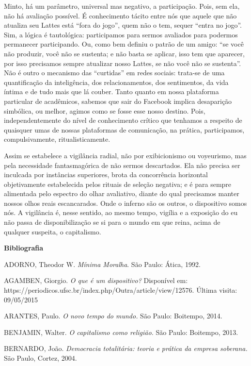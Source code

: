 Minto, há um parâmetro, universal mas negativo, a participação. Pois,
sem ela, não há avaliação possível. É conhecimento tácito entre nós que
aquele que não atualiza seu Lattes está ``fora do jogo'', quem não o
tem, sequer ``entra no jogo''. Sim, a lógica é tautológica: participamos
para sermos avaliados para podermos permanecer participando. Ou, como
bem definiu o patrão de um amigo: ``se você não produzir, você não se
sustenta; e não basta se aplicar, isso tem que aparecer, por isso
precisamos sempre atualizar nosso Lattes, se não você não se sustenta''.
Não é outro o mecanismo das ``curtidas'' em redes sociais: trata-se de
uma quantificação da inteligência, dos relacionamentos, dos sentimentos,
da vida íntima e de tudo mais que lá couber. Tanto quanto em nossa
plataforma particular de acadêmicos, sabemos que sair do Facebook
implica desaparição simbólica, ou melhor, agimos como se fosse esse
nosso destino. Pois, independentemente do nível de conhecimento crítico
que tenhamos a respeito de quaisquer umas de nossas plataformas de
comunicação, na prática, participamos, compulsivamente,
ritualisticamente.

Assim se estabelece a vigilância radial, não por exibicionismo ou
voyeurismo, mas pela necessidade fantasmagórica de não sermos
descartados. Ela não precisa ser inculcada por instâncias superiores,
brota da concorrência horizontal objetivamente estabelecida pelos
rituais de seleção negativa; e é para sempre alimentada pelo espectro do
olhar avaliativo, diante do qual precisamos manter nossos olhos reais
escancarados. Onde o inferno são os outros, o dispositivo somos nós. A
vigilância é, nesse sentido, ao mesmo tempo, vigília e a exposição do eu
não passa de disponibilização se si para o mundo em que reina, acima de
qualquer suspeita, o capitalismo.

\textbf{Bibliografia}

ADORNO, Theodor W. \emph{Mínima Moralha}. São Paulo: Ática, 1992.

AGAMBEN, Giorgio. \emph{O que é um dispositivo?} Disponível em:
https://periodicos.ufsc.br/index.php/Outra/article/view/12576. Última
visita: 09/05/2015

ARANTES, Paulo. \emph{O novo tempo do mundo.} São Paulo: Boitempo, 2014.

BENJAMIN, Walter. \emph{O capitalismo como religião.} São Paulo:
Boitempo, 2013.

BERNARDO, João. \emph{Democracia totalitária: teoria e prática da
empresa soberana.} São Paulo, Cortez, 2004.

